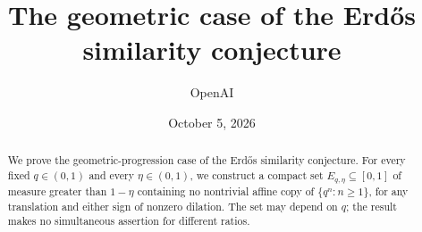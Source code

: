 \documentclass[11pt]{article}
\title{The geometric case of the Erd\H{o}s similarity conjecture}
\author{OpenAI}
\date{October 5, 2026}
\theoremstyle{definition}
\theoremstyle{remark}
\newcommand{\1}{\mathbf 1}
\numberwithin{equation}{section}
\begin{document}
\maketitle
\begin{abstract}
We prove the geometric-progression case of the Erd\H{o}s similarity
conjecture. For every fixed $q\in(0,1)$ and every $\eta\in(0,1)$, we
construct a compact set $E_{q,\eta}\subseteq[0,1]$ of measure greater
than $1-\eta$ containing no nontrivial affine copy of
$\{q^n:n\ge1\}$, for any translation and either sign of nonzero dilation.
The set may depend on $q$; the result makes no simultaneous assertion
for different ratios.
\end{abstract}






{
\raggedright

}
\end{document}

